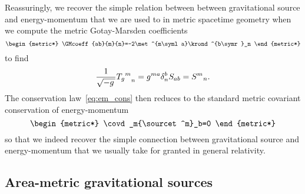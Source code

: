 Reassuringly, we recover the simple relation between between gravitational source and energy-momentum that we are used to in metric spacetime geometry when we compute the metric Gotay-Marsden coefficients
\begin{equation}
	\begin{metric*}
		\GMcoeff{ab}{m}{n}=-2\met^{m\syml a}\krond^{b\symr}_n
	\end{metric*}
\end{equation}
to find
\begin{equation}
	\frac{1}{\sqrt{-g\,}}{{T_g}^m}_n=g^{ma}\delta^b_nS_{ab}={S^m}_n
	\mathpunct{.}
\end{equation}
The conservation law~\eqref{eq:em_cons} then reduces to the standard metric covariant conservation of energy-momentum
\begin{equation}
	\begin{metric*}
		\covd_m{\sourcet^m}_b=0
	\end{metric*}
\end{equation}
so that we indeed recover the simple connection between gravitational source and energy-momentum that we usually take for granted in general relativity.

\subsection{Area-metric gravitational sources}

